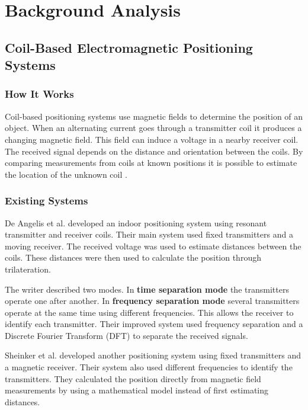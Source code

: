 \chapter{Background Analysis} \label{sec:background-analysis}

\section{Coil-Based Electromagnetic Positioning Systems}\label{sec:bg-1-1}
\subsection{How It Works}\label{sec:bg-1-1-1}

Coil-based positioning systems use magnetic fields to determine the position of an object. When an alternating 
current goes through a transmitter coil it produces a changing magnetic field. This field can induce a voltage 
in a nearby receiver coil. The received signal depends on the distance and orientation between the coils. 
By comparing measurements from coils at known positions it is possible to estimate the location of the unknown 
coil \cite{deangelis2015indoor}.



\subsection{Existing Systems}\label{sec:bg-1-1-2}

De Angelis et al. \cite{deangelis2015indoor} developed an indoor positioning system using resonant transmitter and 
receiver coils. Their main system used fixed transmitters and a moving receiver. The received voltage was used 
to estimate distances between the coils. These distances were then used to calculate the position through 
trilateration.

The writer described two modes. In \textbf{time separation mode} the transmitters operate one after 
another. In \textbf{frequency separation mode} several transmitters operate at the same time using different 
frequencies. This allows the receiver to identify each transmitter. Their improved system used frequency separation 
and a Discrete Fourier Transform (DFT) to separate the received signals.

Sheinker et al. \cite{sheinker2013localization} developed another positioning system using fixed transmitters and 
a magnetic receiver. Their system also used different frequencies to identify the transmitters. They 
calculated the position directly from magnetic field measurements by using a mathematical model instead of first 
estimating distances.

